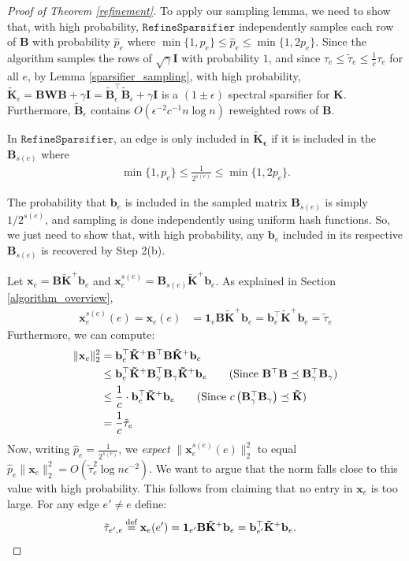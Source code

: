 \documentclass[11pt]{article}
\newcommand{\eqdef}{\mathbin{\stackrel{\rm def}{=}}}
\newcommand{\norm}[1]{\|#1\|}
\newcommand{\bv}[1]{\mathbf{#1}}
\newcommand{\refine}{\texttt{RefineSparsifier}}
\begin{document}
\begin{proof}[Proof of Theorem \ref{refinement}]
To apply our sampling lemma, we need to show that, with high probability, $\refine$ independently samples each row of $\bv{B}$ with probability $\hat p_e$ where $ \min \{1, p_e \} \le \hat p_e \le \min \{1, 2p_e \}$. Since the algorithm samples the rows of $\sqrt{\gamma} \bv{I}$ with probability $1$, and since $\tau_e \le \tilde \tau_e \le \frac{1}{c} \tau_e$ for all $e$, by Lemma \ref{sparsifier_sampling}, with high probability, $\bv{\tilde K}_\epsilon = \bv{B} \bv{W} \bv{B} + \gamma \bv{I} = \bv{\tilde B}_\epsilon^\top \bv{\tilde B}_\epsilon + \gamma \bv{I}$ is a $(1\pm \epsilon)$ spectral sparsifier for $\bv{K}$. Furthermore, $\bv{\tilde B}_\epsilon$ contains $O(\epsilon^{-2}c^{-1} n\log n )$ reweighted rows of $\bv{B}$.

In $\refine$, an edge is only included in $\bv{\tilde K_\epsilon}$ if it is included in the $\bv{B}_{s(e)}$ where
\begin{align*}
\min \{1, p_e \}\le \frac{1}{2^{s(e)}} \le \min \{1, 2p_e \}.
\end{align*}

The probability that $\bv{b}_e$ is included in the sampled matrix $\bv{B}_{s(e)}$ is simply $1/2^{s(e)}$, and sampling is done independently using uniform hash functions. So, we just need to show that, with high probability, any $\bv{b}_e$ included in its respective $\bv{B}_{s(e)}$ is recovered by Step 2(b).

Let $\bv{x}_e = \bv{B}\bv{\tilde K}^+\bv{b}_e$ and $\bv{x}_e^{s(e)} = \bv{B}_{s(e)}\bv{\tilde K}^+\bv{b}_e$. 
As explained in Section \ref{algorithm_overview},
\begin{align}
\label{entry_is_lev_score}
\bv{x}_e^{s(e)}(e) = \bv{x}_e(e) &= \bv{1}_e \bv{B} \bv{\tilde K}^+ \bv{b}_e = \bv{b}_e^\top \bv{\tilde K}^+ \bv{b}_e = \tilde \tau_e
\end{align} 
Furthermore, we can compute:
\begin{align}
\norm{\bv{x}_e}_2^2 &=  \bv{b}_e^\top  \bv{\tilde K}^+ \bv{B}^\top \bv{B} \bv{\tilde K}^+ \bv{b}_e\nonumber\\
&\le  \bv{b}_e^\top  \bv{\tilde K}^+ \bv{B}_\gamma^\top \bv{B}_\gamma \bv{\tilde K}^+ \bv{b}_e\tag{Since $\bv{B}^\top \bv{B} \preceq \bv{B}_\gamma^\top \bv{B}_\gamma$}\\
&\le \frac{1}{c} \cdot \bv{b}_e^\top \bv{\tilde K}^+ \bv{b}_e\tag{Since $c \left (\bv{B}_\gamma^\top \bv{B}_\gamma \right ) \preceq \bv{\tilde K}$}\\
\label{real_eqn}
&= \frac{1}{c} \tilde \tau_e
\end{align} 
Now, writing $\hat p_e = \frac{1}{2^{s(e)}}$, we \emph{expect} $\|\bv{x}_e^{s(e)}(e)\|_2^2$ to equal $\hat{p}_e \norm{\bv{x}_e}_2^2 = O(\tilde{\tau}_e^2\log n\epsilon^{-2})$. We want to argue that the norm falls close to this value with high probability. This follows from claiming that no entry in $\bv{x}_e$ is too large.
For any edge $e' \neq e$ define:
\begin{align*}
\tilde \tau_{e',e} \eqdef \bv{x}_e(e') &= \bv{1}_{e'} \bv{B} \bv{\tilde K}^+ \bv{b}_e = \bv{b}_{e'}^\top \bv{\tilde K}^+ \bv{b}_e.
\end{align*}


\end{proof}
\end{document}
